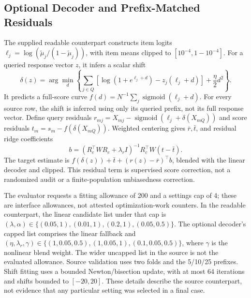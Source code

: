 \documentclass{article}
\newcommand{\sigmoid}{\operatorname{sigmoid}}
\begin{document}
\subsection{Optional Decoder and Prefix-Matched Residuals}
The supplied readable counterpart constructs item logits $\ell_j=\log(\tilde\mu_j/(1-\tilde\mu_j))$, with item means clipped to $[10^{-4},1-10^{-4}]$. For a queried response vector $z$, it infers a scalar shift
\begin{equation}
\delta(z)=\arg\min_d\left\{\sum_{j\in Q}\left[\log(1+e^{\ell_j+d})-z_j(\ell_j+d)\right]+\frac{\eta}{2}d^2\right\}.
\end{equation}
It predicts a full-score curve $f(d)=N^{-1}\sum_j\sigmoid(\ell_j+d)$. For every source row, the shift is inferred using only its queried prefix, not its full response vector. Define query residuals $r_{mj}=X_{mj}-\sigmoid(\ell_j+\delta(X_{mQ}))$ and score residuals $t_m=s_m-f(\delta(X_{mQ}))$. Weighted centering gives $\bar r,\bar t$, and residual ridge coefficients
\begin{equation}
b=(R_c^\top W R_c+\lambda_r I)^{-1}R_c^\top W(t-\bar t).
\end{equation}
The target estimate is $f(\delta(z))+\bar t+(r(z)-\bar r)^\top b$, blended with the linear decoder and clipped. This residual term is supervised score correction, not a randomized audit or a finite-population unbiasedness correction.

The evaluator requests a fitting allowance of 200 and a settings cap of 4; these are interface allowances, not attested optimization-work counters. In the readable counterpart, the linear candidate list under that cap is $(\lambda,\alpha)\in\{(0.05,1),(0.01,1),(0.2,1),(0.05,0.5)\}$. The optional decoder's capped list comprises the linear fallback and $(\eta,\lambda_r,\gamma)\in\{(1,0.05,0.5),(1,0.05,1),(0.1,0.05,0.5)\}$, where $\gamma$ is the nonlinear blend weight. The wider uncapped list in the source is not the evaluated allowance. Source validation uses two folds and the 5/10/25 prefixes. Shift fitting uses a bounded Newton/bisection update, with at most 64 iterations and shifts bounded to $[-20,20]$. These details describe the source counterpart, not evidence that any particular setting was selected in a final case.
\end{document}
